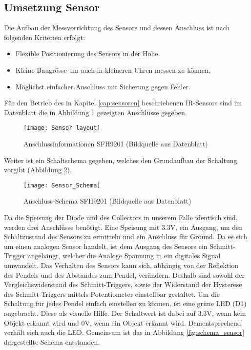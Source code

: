 \subsection{Umsetzung Sensor}
\label{cap:umsetzung_sensor}
	Die Aufbau der Messvorrichtung des Sensors und dessen Anschluss ist nach folgenden Kriterien erfolgt:
	\begin{itemize}
		\item Flexible Positionierung des Sensors in der Höhe.
		\item Kleine Baugrösse um auch in kleineren Uhren messen zu können.
		\item Möglichst einfacher Anschluss mit Sicherung gegen Fehler.
	\end{itemize}
	Für den Betrieb des in Kapitel \ref{cap:sensoren} beschriebenen IR-Sensors sind im Datenblatt die in Abbildung \ref{fig:info_SFH9201} gezeigten Anschlüsse gegeben.
	\begin{figure}[H]
		\centering
		\texttt{[image: Sensor\_layout]}
		\caption{Anschlussinformationen SFH9201 (Bildquelle aus Datenblatt)}
		\label{fig:info_SFH9201}
	\end{figure}
	Weiter ist ein Schaltschema gegeben, welches den Grundaufbau der Schaltung vorgibt (Abbildung \ref{fig:schema_SFH9201}).
	\begin{figure}[H]
		\centering
		\texttt{[image: Sensor\_Schema]}
		\caption{Anschluss-Schema SFH9201 (Bildquelle aus Datenblatt)}
		\label{fig:schema_SFH9201}
	\end{figure}
	\noindent Da die Speisung der Diode und des Collectors in unserem Falle identisch sind, werden drei Anschlüsse benötigt. Eine Speisung mit 3.3V, ein Ausgang, um den Schaltzustand des Sensors zu ermitteln und ein Anschluss für Ground. 
Da es sich um einen analogen Sensor handelt, ist dem Ausgang des Sensors ein Schmitt-Trigger angehängt, welcher die Analoge Spannung in ein digitales Signal umwandelt. 
Das Verhalten des Sensors kann sich, abhängig von der Reflektion des Pendels und des Abstandes zum Pendel, verändern. Deshalb sind sowohl der Vergleichswiderstand des Schmitt-Triggers, sowie der Widerstand der Hysterese des Schmitt-Triggers mittels Potentiometer einstellbar gestaltet. 
Um die Schaltung für jedes Pendel einfach einstellen zu können, ist eine grüne LED (D1) angebracht. Diese als visuelle Hilfe. Der Schaltwert ist dabei auf 3.3V, wenn kein Objekt erkannt wird und 0V, wenn ein Objekt erkannt wird. Dementsprechend verhält sich auch die LED. Gemeinsam ist das in Abbildung \ref{fig:schema_sensor} dargestellte Schema entstanden.
